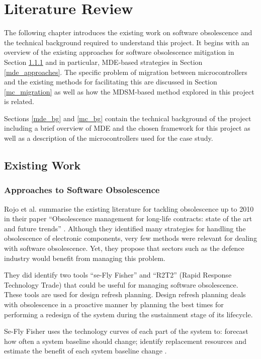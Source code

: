 \documentclass{UoYCSproject}
\begin{document}
\chapter{Literature Review}
The following chapter introduces the existing work on software obsolescence and the technical background required to understand this project. It begins with an overview of the existing approaches for software obsolescence mitigation in Section \ref{so_approaches} and in particular, MDE-based strategies in Section \ref{mde_approaches}. The specific problem of migration between microcontrollers and the existing methods for facilitating this are discussed in Section \ref{mc_migration} as well as how the MDSM-based method explored in this project is related. 

Sections \ref{mde_bg} and \ref{mc_bg} contain the technical background of the project including a brief overview of MDE and the chosen framework for this project as well as a description of the microcontrollers used for the case study.

\section{Existing Work}
\subsection{Approaches to Software Obsolescence} \label{so_approaches}
Rojo et al. summarise the existing literature for tackling obsolescence up to 2010 in their paper ``Obsolescence management for long-life contracts: state of the art and future trends'' \parencite{rojo2010obsolescence}. Although they identified many strategies for handling the obsolescence of electronic components, very few methods were relevant for dealing with software obsolescence. Yet, they propose that sectors such as the defence industry would benefit from managing this problem.

They did identify two tools ``se-Fly Fisher'' and ``R2T2'' (Rapid Response Technology Trade) that could be useful for managing software obsolescence. These tools are used for design refresh planning. Design refresh planning deals with obsolescence in a proactive manner by planning the best times for performing a redesign of the system during the sustainment stage of its lifecycle. 

Se-Fly Fisher uses the technology curves of each part of the system to: forecast how often a system baseline should change; identify replacement resources and estimate the benefit of each system baseline change \parencite{rojo2010obsolescence}.
\end{document}
